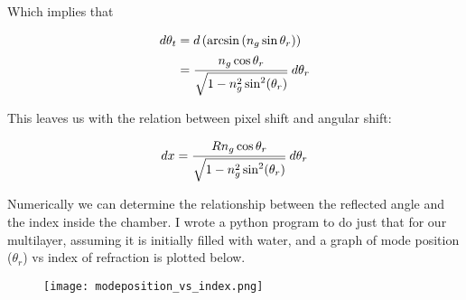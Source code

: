 Which implies that

\begin{equation*}
\begin{split}
	d\theta_t & = d\left(\arcsin\left(n_g \sin{\theta_r}\right)\right) \\
			  & = \cfrac{n_g \cos{\theta_r}}{\sqrt{1-n_g^2 \sin^{2}(\theta_r)}}\,\,d\theta_r
\end{split}
\end{equation*}


This leaves us with the relation between pixel shift and angular shift:

\begin{equation}
	dx = \cfrac{R n_g \cos{\theta_r}}{\sqrt{1-n_g^2 \sin^{2}(\theta_r)}} \,\,d\theta_r
\end{equation}

Numerically we can determine the relationship between the reflected angle and the index inside the chamber. I wrote a python program to do just that for our multilayer, assuming it is initially filled with water, and a graph of mode position ($\theta_r$) vs index of refraction is plotted below.

\begin{figure}[h]
\begin{center}
\texttt{[image: modeposition\_vs\_index.png]}
\end{center}
\end{figure}